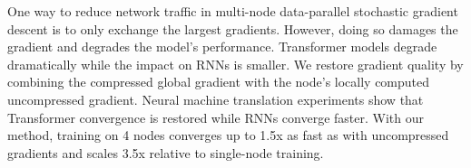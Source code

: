 One way to reduce network traffic in multi-node data-parallel stochastic gradient descent is to only exchange the largest gradients. However, doing so damages the gradient and degrades the model's performance. Transformer models degrade dramatically while the impact on RNNs is smaller. We restore gradient quality by combining the compressed global gradient with the node's locally computed uncompressed gradient. Neural machine translation experiments show that Transformer convergence is restored while RNNs converge faster.  With our method, training on 4 nodes converges up to 1.5x as fast as with uncompressed gradients and scales 3.5x relative to single-node training.